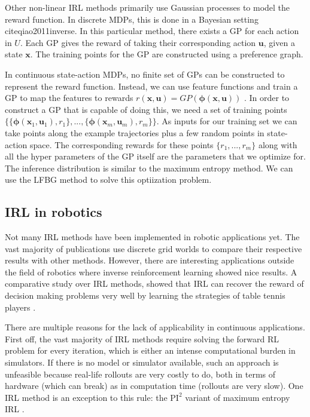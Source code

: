 \documentclass[mscThesis.tex]{subfiles}
\begin{document}
Other non-linear IRL methods primarily use Gaussian processes to model the reward function. In discrete MDPs, this is done in a Bayesian setting cite{qiao2011inverse}. In this particular method, there exists a GP for each action in $U$. Each GP gives the reward of taking their corresponding action $\bm{u}$, given a state $\bm{x}$. The training points for the GP are constructed using a preference graph.

In continuous state-action MDPs, no finite set of GPs can be constructed to represent the reward function. Instead, we can use feature functions and train a GP to map the features to rewards $r(\bm{x}, \bm{u}) = GP(\bm{\phi}(\bm{x}, \bm{u}))$ \cite{Levine2011}. In order to construct a GP that is capable of doing this, we need a set of training points $\{\{\bm{\phi}(\bm{x}_1, \bm{u}_1), r_1\},...,\{\bm{\phi}(\bm{x}_m, \bm{u}_m), r_m\}\}$. As inputs for our training set we can take points along the example trajectories plus a few random points in state-action space. The corresponding rewards for these points $\{r_1,...,r_m\}$ along with all the hyper parameters of the GP itself are the parameters that we optimize for. The inference distribution is similar to the maximum entropy method. We can use the LFBG method to solve this optiization problem.  

\subsection{IRL in robotics}
Not many IRL methods have been implemented in robotic applications yet. The vast majority of publications use discrete grid worlds to compare their respective results with other methods. However, there are interesting applications outside the field of robotics where inverse reinforcement learning showed nice results. A comparative study over IRL methods, showed that IRL can recover the reward of decision making problems very well by learning the strategies of table tennis players \cite{muelling2014learning}.

There are multiple reasons for the lack of applicability in continuous applications. First off, the vast majority of IRL methods require solving the forward RL problem for every iteration, which is either an intense computational burden in simulators. If there is no model or simulator available, such an approach is unfeasible because real-life rollouts are very costly to do, both in terms of hardware (which can break) as in computation time (rollouts are very slow). One IRL method is an exception to this rule: the $\text{PI}^2$ variant of maximum entropy IRL \cite{Kalakrishnan2013}. 
\end{document}
